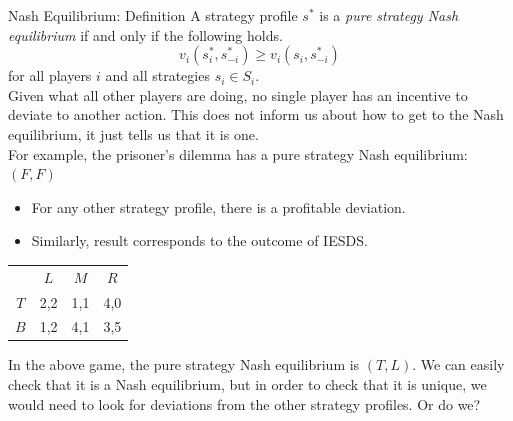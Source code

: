 \documentclass[10pt]{extarticle}
\begin{document}
  \begin{problem}{Nash Equilibrium: Definition}
    A strategy profile $s^{*}$ is a \textit{pure strategy Nash equilibrium} if and only if the following holds.
    \[
      v_i(s^{*}_i,s^{*}_{-i}) \geq v_i (s_i,s^{*}_{-i})
    \] 
    for all players $i$ and all strategies $s_i\in S_i$.\\

    Given what all other players are doing, no single player has an incentive to deviate to another action. This does not inform us about how to get to the Nash equilibrium, it just tells us that it is one.\\

    For example, the prisoner's dilemma has a pure strategy Nash equilibrium: $(F,F)$
    \begin{itemize}
      \item For any other strategy profile, there is a profitable deviation.
      \item Similarly, result corresponds to the outcome of IESDS.
    \end{itemize}
    \begin{center}
      \renewcommand{\arraystretch}{1.25}
      \begin{tabular}{c|c|c|c|}
        \multicolumn{1}{c}{} & \multicolumn{1}{c}{$L$} & \multicolumn{1}{c}{$M$} & \multicolumn{1}{c}{$R$}\\\cline{2-4}
        $T$ & 2,2 & 1,1 & 4,0 \\\cline{2-4}
        $B$ & 1,2 & 4,1 & 3,5 \\\cline{2-4}
      \end{tabular}
    \end{center}
    In the above game, the pure strategy Nash equilibrium is $(T,L)$. We can easily check that it is a Nash equilibrium, but in order to check that it is unique, we would need to look for deviations from the other strategy profiles. Or do we?
  \end{problem}
\end{document}
